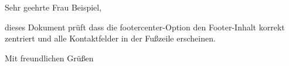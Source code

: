 \documentclass[modern, footercenter, lang=german]{../../onlinebrief24}
\begin{document}
\begin{letter}{}
\opening{Sehr geehrte Frau Beispiel,}

dieses Dokument prüft dass die footercenter-Option den Footer-Inhalt
korrekt zentriert und alle Kontaktfelder in der Fußzeile erscheinen.

\closing{Mit freundlichen Grüßen}
\end{letter}
\end{document}
